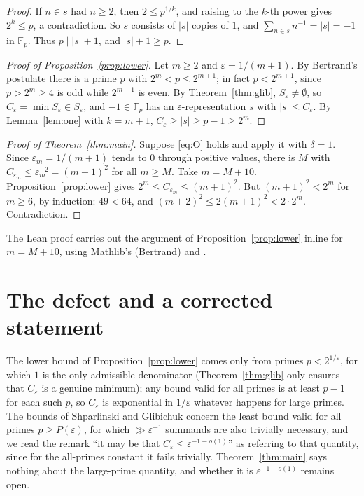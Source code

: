 \documentclass[11pt]{amsart}
\theoremstyle{plain}
\theoremstyle{definition}
\newcommand{\F}{\mathbb{F}_p}
\newcommand{\eps}{\varepsilon}
\begin{document}
{\begin{proof}
If $n\in s$ had $n\ge2$, then $2\le p^{1/k}$, and raising to the $k$-th power gives $2^k\le p$, a contradiction. So $s$ consists of $|s|$ copies of $1$, and $\sum_{n\in s}n^{-1}=|s|=-1$ in $\F$. Thus $p\mid|s|+1$, and $|s|+1\ge p$.
\end{proof}

\begin{proof}[Proof of Proposition~\ref{prop:lower}]
Let $m\ge2$ and $\eps=1/(m+1)$. By Bertrand's postulate there is a prime $p$ with $2^m<p\le2^{m+1}$; in fact $p<2^{m+1}$, since $p>2^m\ge4$ is odd while $2^{m+1}$ is even. By Theorem~\ref{thm:glib}, $S_\eps\ne\emptyset$, so $C_\eps=\min S_\eps\in S_\eps$, and $-1\in\F$ has an $\eps$-representation $s$ with $|s|\le C_\eps$. By Lemma~\ref{lem:one} with $k=m+1$, $C_\eps\ge|s|\ge p-1\ge2^m$.
\end{proof}

\begin{proof}[Proof of Theorem~\ref{thm:main}]
Suppose \eqref{eq:O} holds and apply it with $\delta=1$. Since $\eps_m=1/(m+1)$ tends to $0$ through positive values, there is $M$ with $C_{\eps_m}\le\eps_m^{-2}=(m+1)^2$ for all $m\ge M$. Take $m=M+10$. Proposition~\ref{prop:lower} gives $2^m\le C_{\eps_m}\le(m+1)^2$. But $(m+1)^2<2^m$ for $m\ge6$, by induction: $49<64$, and $(m+2)^2\le2(m+1)^2<2\cdot2^m$. Contradiction.
\end{proof}

The Lean proof carries out the argument of Proposition~\ref{prop:lower} inline for $m=M+10$, using Mathlib's  (Bertrand) and .

\section{The defect and a corrected statement}\label{sec:defect}

The lower bound of Proposition~\ref{prop:lower} comes only from primes $p<2^{1/\eps}$, for which $1$ is the only admissible denominator (Theorem~\ref{thm:glib} only ensures that $C_\eps$ is a genuine minimum); any bound valid for all primes is at least $p-1$ for each such $p$, so $C_\eps$ is exponential in $1/\eps$ whatever happens for large primes. The bounds of Shparlinski and Glibichuk concern the least bound valid for all primes $p\ge P(\eps)$, for which $\gg\eps^{-1}$ summands are also trivially necessary, and we read the remark ``it may be that $C_\eps\le\eps^{-1-o(1)}$'' as referring to that quantity, since for the all-primes constant it fails trivially. Theorem~\ref{thm:main} says nothing about the large-prime quantity, and whether it is $\eps^{-1-o(1)}$ remains open.

}
\end{document}
